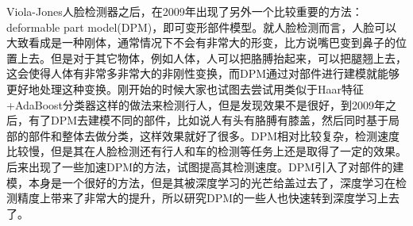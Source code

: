 Viola-Jones人脸检测器之后，在2009年出现了另外一个比较重要的方法：deformable
part model(DPM)\cite{dpm}，即可变形部件模型。就人脸检测而言，人脸可以大致看成是一种刚体，通常情况下不会有非常大的形变，比方说嘴巴变到鼻子的位置上去。但是对于其它物体，例如人体，人可以把胳膊抬起来，可以把腿翘上去，这会使得人体有非常多非常大的非刚性变换，而DPM通过对部件进行建模就能够更好地处理这种变换。刚开始的时候大家也试图去尝试用类似于Haar特征+AdaBoost分类器这样的做法来检测行人，但是发现效果不是很好，到2009年之后，有了DPM去建模不同的部件，比如说人有头有胳膊有膝盖，然后同时基于局部的部件和整体去做分类，这样效果就好了很多。DPM相对比较复杂，检测速度比较慢，但是其在人脸检测还有行人和车的检测等任务上还是取得了一定的效果。后来出现了一些加速DPM的方法，试图提高其检测速度。DPM引入了对部件的建模，本身是一个很好的方法，但是其被深度学习的光芒给盖过去了，深度学习在检测精度上带来了非常大的提升，所以研究DPM的一些人也快速转到深度学习上去了。